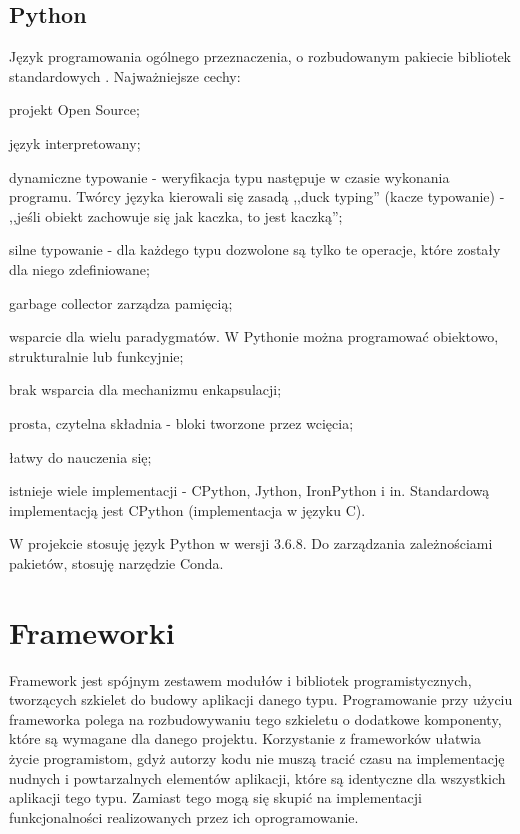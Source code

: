 \subsection{Python}
Język programowania ogólnego przeznaczenia, o rozbudowanym pakiecie bibliotek standardowych 
\cite{python:wikipedia}.
Najważniejsze cechy:
\begin{itemize*}
\item projekt Open Source;
\item język interpretowany;
\item dynamiczne typowanie - weryfikacja typu następuje w czasie wykonania programu. Twórcy języka kierowali się zasadą ,,duck typing'' (kacze typowanie) - ,,jeśli obiekt zachowuje się jak kaczka, to jest kaczką'';
\item silne typowanie - dla każdego typu dozwolone są tylko te operacje, które zostały dla niego zdefiniowane;
\item garbage collector zarządza pamięcią;
\item wsparcie dla wielu paradygmatów. W Pythonie można programować obiektowo, strukturalnie lub funkcyjnie;
\item brak wsparcia dla mechanizmu enkapsulacji;
\item prosta, czytelna składnia - bloki tworzone przez wcięcia;
\item łatwy do nauczenia się;
\item istnieje wiele implementacji - CPython, Jython, IronPython i in. Standardową implementacją jest CPython (implementacja w języku C).
\end{itemize*}
W projekcie stosuję język Python w wersji 3.6.8. Do zarządzania zależnościami pakietów, stosuję narzędzie Conda.

\section{Frameworki}
Framework jest spójnym zestawem modułów i bibliotek programistycznych, tworzących szkielet do budowy aplikacji danego typu. Programowanie przy użyciu frameworka polega na rozbudowywaniu tego szkieletu o dodatkowe komponenty, które są wymagane dla danego projektu. Korzystanie z frameworków ułatwia życie programistom, gdyż autorzy kodu nie muszą tracić czasu na implementację nudnych i powtarzalnych elementów aplikacji, które są identyczne dla wszystkich aplikacji tego typu. Zamiast tego mogą się skupić na implementacji funkcjonalności realizowanych przez ich oprogramowanie.
